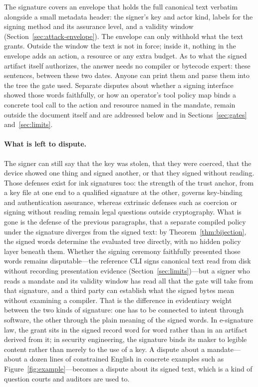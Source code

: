 \documentclass[10pt,twocolumn]{article}
\theoremstyle{plain}
\theoremstyle{definition}
\begin{document}
The signature covers an envelope that holds the full canonical text verbatim alongside a small metadata header: the signer's key and actor kind, labels for the signing method and its assurance level, and a validity window (Section~\ref{sec:attack-envelope}). The envelope can only withhold what the text grants. Outside the window the text is not in force; inside it, nothing in the envelope adds an action, a resource or any extra budget. As to what the signed artifact itself authorizes, the answer needs no compiler or bytecode expert: these sentences, between these two dates. Anyone can print them and parse them into the tree the gate used. Separate disputes about whether a signing interface showed those words faithfully, or how an operator's tool policy map binds a concrete tool call to the action and resource named in the mandate, remain outside the document itself and are addressed below and in Sections~\ref{sec:gates} and~\ref{sec:limits}.

\paragraph{What is left to dispute.}
The signer can still say that the key was stolen, that they were coerced, that the device showed one thing and signed another, or that they signed without reading. Those defenses exist for ink signatures too: the strength of the trust anchor, from a key file at one end to a qualified signature at the other, governs key-binding and authentication assurance, whereas extrinsic defenses such as coercion or signing without reading remain legal questions outside cryptography. What is gone is the defense of the previous paragraphs, that a separate compiled policy under the signature diverges from the signed text: by Theorem~\ref{thm:bijection}, the signed words determine the evaluated tree directly, with no hidden policy layer beneath them. Whether the signing ceremony faithfully presented those words remains disputable---the reference CLI signs canonical text read from disk without recording presentation evidence (Section~\ref{sec:limits})---but a signer who reads a mandate and its validity window has read all that the gate will take from that signature, and a third party can establish what the signed bytes mean without examining a compiler. That is the difference in evidentiary weight between the two kinds of signature: one has to be connected to intent through software, the other through the plain meaning of the signed words. In e-signature law, the grant sits in the signed record word for word rather than in an artifact derived from it; in security engineering, the signature binds its maker to legible content rather than merely to the use of a key. A dispute about a mandate---about a dozen lines of constrained English in concrete examples such as Figure~\ref{fig:example}---becomes a dispute about its signed text, which is a kind of question courts and auditors are used to.
\end{document}
